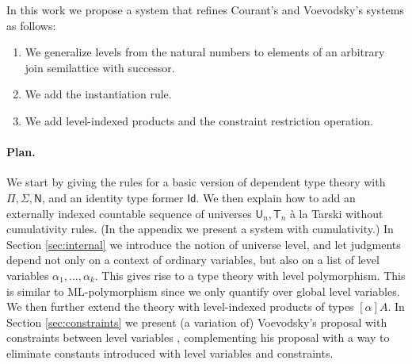 \documentclass[11pt,a4paper]{article}
\theoremstyle{definition}
\newcommand{\Id}{\mathsf{Id}}
\newcommand{\NN}{\mathsf{N}}
\newcommand{\UU}{\mathsf{U}}
\newcommand{\Level}{\mathsf{Level}}
\newcommand{\T}{\mathsf{T}}
\begin{document}
In this work we propose a system that refines
Courant's \cite{Courant02} and Voevodsky's \cite{VV} systems as follows:
  \begin{enumerate}
  \item
    We generalize levels from the natural numbers to elements of an arbitrary join semilattice with successor.
  \item We add the instantiation rule.
  \item We add level-indexed products and the constraint restriction operation.
\end{enumerate}






\paragraph{Plan.} We start by giving the rules for a basic version of dependent type theory with
$\Pi, \Sigma, \NN$, and an identity type former $\Id$.
We then explain how to add an externally indexed countable sequence of universes $\UU_n, \T_n$ \`a la Tarski without
cumulativity rules. (In the appendix we present a system with cumulativity.)
In Section \ref{sec:internal} we introduce the notion of universe level, and let judgments depend not only on a context of ordinary variables, but also on a list of level variables $\alpha_1, \ldots, \alpha_k$. This gives rise to a type theory with level polymorphism. This is similar to ML-polymorphism since we only quantify over global level variables. We then further extend the theory with level-indexed products of types $[\alpha]A$.
%
In Section \ref{sec:constraints} we present (a variation of) Voevodsky's proposal with constraints between level variables  \cite{VV}, complementing his proposal with a way to eliminate constants introduced with level variables and constraints.
\end{document}
